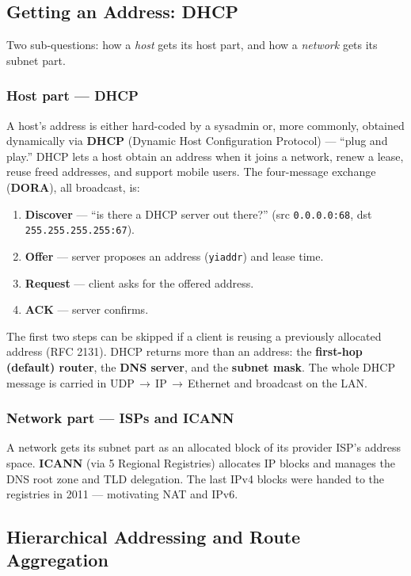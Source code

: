 \documentclass[hidelinks]{article}
\begin{document}
\subsection{Getting an Address: DHCP}

Two sub-questions: how a \emph{host} gets its host part, and how a
\emph{network} gets its subnet part.

\subsubsection{Host part --- DHCP}
A host's address is either hard-coded by a sysadmin or, more commonly,
obtained dynamically via \textbf{DHCP} (Dynamic Host Configuration Protocol)
--- ``plug and play.'' DHCP lets a host obtain an address when it joins a
network, renew a lease, reuse freed addresses, and support mobile users. The
four-message exchange (\textbf{DORA}), all broadcast, is:
\begin{enumerate}
    \item \textbf{Discover} --- ``is there a DHCP server out there?''
    (src \texttt{0.0.0.0:68}, dst \texttt{255.255.255.255:67}).
    \item \textbf{Offer} --- server proposes an address (\texttt{yiaddr}) and
    lease time.
    \item \textbf{Request} --- client asks for the offered address.
    \item \textbf{ACK} --- server confirms.
\end{enumerate}
The first two steps can be skipped if a client is reusing a previously
allocated address (RFC 2131). DHCP returns more than an address: the
\textbf{first-hop (default) router}, the \textbf{DNS server}, and the
\textbf{subnet mask}. The whole DHCP message is carried in
UDP\,$\to$\,IP\,$\to$\,Ethernet and broadcast on the LAN.

\subsubsection{Network part --- ISPs and ICANN}
A network gets its subnet part as an allocated block of its provider ISP's
address space. \textbf{ICANN} (via 5 Regional Registries) allocates IP blocks
and manages the DNS root zone and TLD delegation. The last IPv4 blocks were
handed to the registries in 2011 --- motivating NAT and IPv6.

\subsection{Hierarchical Addressing and Route Aggregation}
\end{document}
